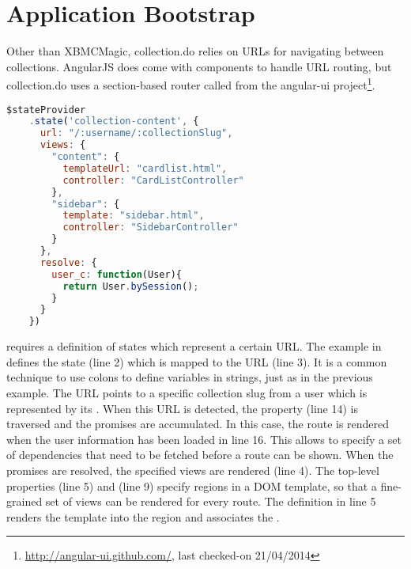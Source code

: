 \section{Application Bootstrap}

Other than XBMCMagic, collection.do relies on URLs for navigating between collections. AngularJS does come with components to handle URL routing, but collection.do uses a section-based router called  from the angular-ui project\footnote{\url{http://angular-ui.github.com/}, last checked-on 21/04/2014}. 

\begin{lstlisting}[language=JavaScript, caption=collection.do router, label=lst:collection-router]
  $stateProvider
    .state('collection-content', {
      url: "/:username/:collectionSlug",
      views: {
        "content": {
          templateUrl: "cardlist.html",
          controller: "CardListController"
        },
        "sidebar": { 
          template: "sidebar.html",
          controller: "SidebarController"
        }
      },
      resolve: {
        user_c: function(User){
          return User.bySession();
        }
      }
    })
\end{lstlisting}

 requires a definition of states which represent a certain URL. The example in  defines the state  (line 2) which is mapped to the URL  (line 3). It is a common technique to use colons to define variables in strings, just as in the previous example. The URL points to a specific collection slug from a user which is represented by its . When this URL is detected, the  property (line 14) is traversed and the promises are accumulated. In this case, the route is rendered when the user information has been loaded in line 16. This allows to specify a set of dependencies that need to be fetched before a route can be shown. When the promises are resolved, the specified views are rendered (line 4). The top-level properties  (line 5) and  (line 9) specify regions in a DOM template, so that a fine-grained set of views can be rendered for every route. The definition in line 5 renders the  template into the  region and associates the .